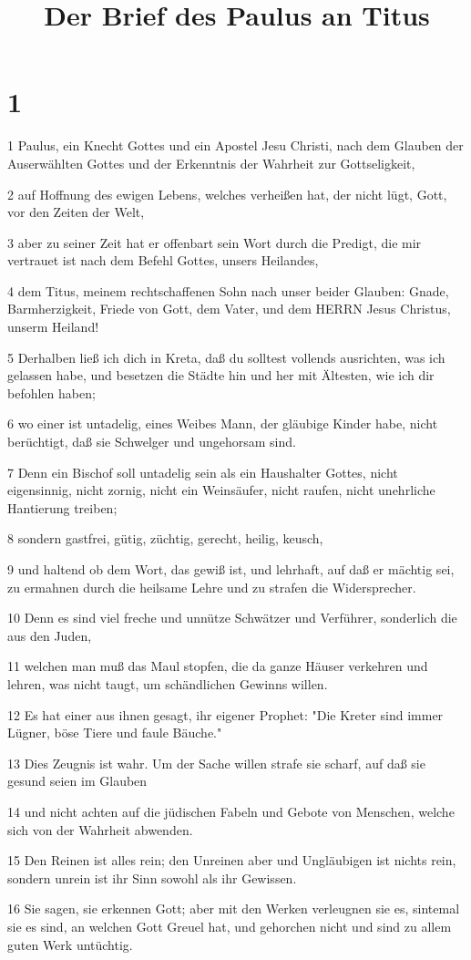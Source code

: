 

\title{Der Brief des Paulus an Titus}


\chapter{1}

\par 1 Paulus, ein Knecht Gottes und ein Apostel Jesu Christi, nach dem Glauben der Auserwählten Gottes und der Erkenntnis der Wahrheit zur Gottseligkeit,
\par 2 auf Hoffnung des ewigen Lebens, welches verheißen hat, der nicht lügt, Gott, vor den Zeiten der Welt,
\par 3 aber zu seiner Zeit hat er offenbart sein Wort durch die Predigt, die mir vertrauet ist nach dem Befehl Gottes, unsers Heilandes,
\par 4 dem Titus, meinem rechtschaffenen Sohn nach unser beider Glauben: Gnade, Barmherzigkeit, Friede von Gott, dem Vater, und dem HERRN Jesus Christus, unserm Heiland!
\par 5 Derhalben ließ ich dich in Kreta, daß du solltest vollends ausrichten, was ich gelassen habe, und besetzen die Städte hin und her mit Ältesten, wie ich dir befohlen haben;
\par 6 wo einer ist untadelig, eines Weibes Mann, der gläubige Kinder habe, nicht berüchtigt, daß sie Schwelger und ungehorsam sind.
\par 7 Denn ein Bischof soll untadelig sein als ein Haushalter Gottes, nicht eigensinnig, nicht zornig, nicht ein Weinsäufer, nicht raufen, nicht unehrliche Hantierung treiben;
\par 8 sondern gastfrei, gütig, züchtig, gerecht, heilig, keusch,
\par 9 und haltend ob dem Wort, das gewiß ist, und lehrhaft, auf daß er mächtig sei, zu ermahnen durch die heilsame Lehre und zu strafen die Widersprecher.
\par 10 Denn es sind viel freche und unnütze Schwätzer und Verführer, sonderlich die aus den Juden,
\par 11 welchen man muß das Maul stopfen, die da ganze Häuser verkehren und lehren, was nicht taugt, um schändlichen Gewinns willen.
\par 12 Es hat einer aus ihnen gesagt, ihr eigener Prophet: "Die Kreter sind immer Lügner, böse Tiere und faule Bäuche."
\par 13 Dies Zeugnis ist wahr. Um der Sache willen strafe sie scharf, auf daß sie gesund seien im Glauben
\par 14 und nicht achten auf die jüdischen Fabeln und Gebote von Menschen, welche sich von der Wahrheit abwenden.
\par 15 Den Reinen ist alles rein; den Unreinen aber und Ungläubigen ist nichts rein, sondern unrein ist ihr Sinn sowohl als ihr Gewissen.
\par 16 Sie sagen, sie erkennen Gott; aber mit den Werken verleugnen sie es, sintemal sie es sind, an welchen Gott Greuel hat, und gehorchen nicht und sind zu allem guten Werk untüchtig.

